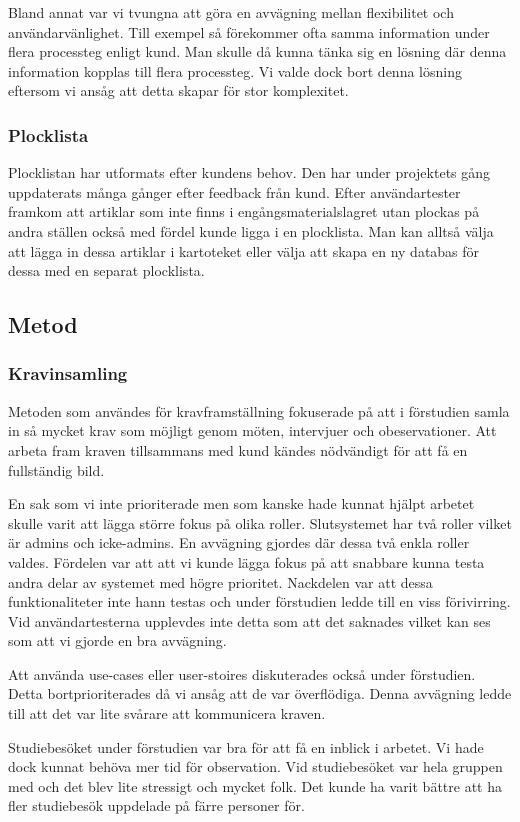 \documentclass{article}
\begin{document}
Bland annat var vi tvungna att göra en avvägning mellan flexibilitet och användarvänlighet.
Till exempel så förekommer ofta samma information under flera processteg enligt kund. Man skulle då kunna tänka sig en lösning där denna information kopplas till flera processteg. Vi valde dock bort denna lösning eftersom vi ansåg att detta skapar för stor komplexitet.

\subsubsection{Plocklista}
Plocklistan har utformats efter kundens behov. Den har under projektets gång uppdaterats många gånger efter feedback från kund. Efter användartester framkom att artiklar som inte finns i engångsmaterialslagret utan plockas på andra ställen också med fördel kunde ligga i en plocklista. Man kan alltså välja att lägga in dessa artiklar i kartoteket eller välja att skapa en ny databas för dessa med en separat plocklista.

\subsection{Metod}
\subsubsection{Kravinsamling}
Metoden som användes för kravframställning fokuserade på att i förstudien samla in så mycket krav som möjligt genom möten, intervjuer och obeservationer. Att arbeta fram kraven tillsammans med kund kändes nödvändigt för att få en fullständig bild. 

En sak som vi inte prioriterade men som kanske hade kunnat hjälpt arbetet skulle varit att lägga större fokus på olika roller. Slutsystemet har två roller vilket är admins och icke-admins. En avvägning gjordes där dessa två enkla roller valdes. Fördelen var att att vi kunde lägga fokus på att snabbare kunna testa andra delar av systemet med högre prioritet. Nackdelen var att dessa funktionaliteter inte hann testas och under förstudien ledde till en viss förivirring. Vid användartesterna upplevdes inte detta som att det saknades vilket kan ses som att vi gjorde en bra avvägning. 


Att använda use-cases eller user-stoires diskuterades också under förstudien. Detta bortprioriterades då vi ansåg att de var överflödiga. Denna avvägning ledde till att det var lite svårare att kommunicera kraven. 


Studiebesöket under förstudien var bra för att få en inblick i arbetet. Vi hade dock kunnat behöva mer tid för observation. Vid studiebesöket var hela gruppen med och det blev lite stressigt och mycket folk. Det kunde ha varit bättre att ha fler studiebesök uppdelade på färre personer för.
\end{document}
